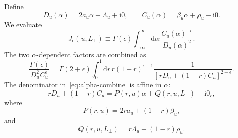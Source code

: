 \documentclass[11pt]{article}
\newcommand{\dd}{\mathrm d}
\newcommand{\ii}{\mathrm i}
\newcommand{\eps}{\epsilon}
\begin{document}
Define
\begin{equation}
D_u(\alpha)=2a_u\alpha+\Lambda_u+\ii0,
\qquad
C_u(\alpha)=\beta_u\alpha+\rho_u-\ii0.
\end{equation}
We evaluate
\begin{equation}
J_\eps(u,L_\perp)
\equiv
\Gamma(\eps)
\int_{-\infty}^{\infty}\dd\alpha\,
\frac{C_u(\alpha)^{-\eps}}{D_u(\alpha)^2}.
\label{eq:J-eps-def}
\end{equation}
The two $\alpha$-dependent factors are combined as
\begin{equation}
\frac{\Gamma(\eps)}{D_u^2 C_u^\eps}
=
\Gamma(2+\eps)
\int_0^1\dd r\,
 r(1-r)^{\eps-1}
\frac1{[rD_u+(1-r)C_u]^{2+\eps}}.
\label{eq:alpha-combine}
\end{equation}
The denominator in~\eqref{eq:alpha-combine} is affine in $\alpha$:
\begin{equation}
 rD_u+(1-r)C_u
 =P(r,u)\alpha+Q(r,u,L_\perp)+\ii0_r,
\label{eq:r-denom}
\end{equation}
where
\begin{equation}
 P(r,u)=2r a_u+(1-r)\beta_u,
\label{eq:P-ru}
\end{equation}
and
\begin{equation}
 Q(r,u,L_\perp)=r\Lambda_u+(1-r)\rho_u.
\label{eq:Q-ru}
\end{equation}
\end{document}
